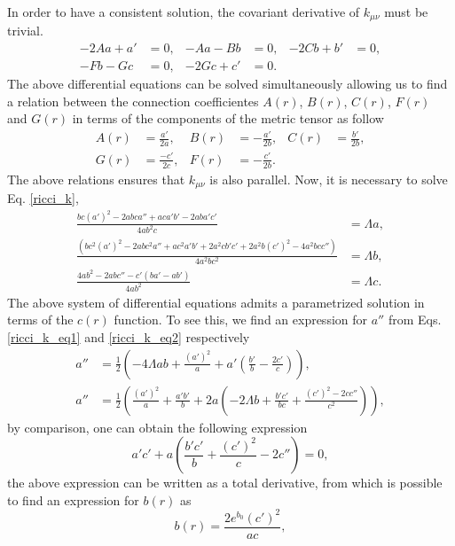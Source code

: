 \documentclass{article}
\begin{document}
In order to have a consistent solution, the covariant
derivative of $k_{\mu\nu}$ must be trivial. 
\begin{align}
    -2Aa + a' & = 0, & -Aa - Bb  & = 0, & -2Cb + b' & = 0, \\
    -Fb - Gc  & = 0, & -2Gc + c' & = 0.
\end{align}
The above differential equations can be solved simultaneously allowing us to find
a relation between the connection coefficientes $A(r)$, $B(r)$, $C(r)$, $F(r)$ and $G(r)$
in terms of the components of the metric tensor as follow
\begin{align}
    A(r) & = \frac{a'}{2a}, & B(r) & =  -\frac{a'}{2b}, & C(r) & = \frac{b'}{2b}, \\
    G(r) & = \frac{-c'}{2c}, & F(r) & = -\frac{c'}{2b}.
\end{align}
The above relations ensures that $k_{\mu\nu}$ is also parallel. Now, it is necessary
to solve Eq. \eqref{ricci_k}, 
\begin{align}
\frac{bc(a')^2 - 2abca'' + aca'b' - 2aba'c'}{4ab^2 c} & = \Lambda a, \label{ricci_k_eq1} \\
\frac{\left(bc^2(a')^2 - 2abc^2a'' + ac^2a'b' + 2a^2cb'c' + 2a^2b(c')^2 - 4a^2bcc''\right)}{4a^2bc^2} & = \Lambda b, \label{ricci_k_eq2} \\
\frac{4ab^2 - 2abc'' - c'\left(ba' - ab'\right)}{4ab^2} & = \Lambda c. \label{ricci_k_eq3}
\end{align}
The above system of differential equations admits a parametrized solution in terms
of the $c(r)$ function. To see this, we find an expression for $a''$ from Eqs. \eqref{ricci_k_eq1}
and \eqref{ricci_k_eq2} respectively
\begin{align}
    a'' & = \frac{1}{2}\left(-4\Lambda ab + \frac{(a')^2}{a} + a'\left(\frac{b'}{b} - \frac{2c'}{c}\right)\right), \\
    a'' & = \frac{1}{2}\left(\frac{(a')^2}{a} + \frac{a'b'}{b} + 2a\left(-2\Lambda b + \frac{b'c'}{bc} + \frac{(c')^2 - 2cc''}{c^2}\right)\right),
\end{align}
by comparison, one can obtain the following expression
\begin{equation}
    a'c' + a\left(\frac{b'c'}{b} + \frac{(c')^2}{c} - 2c''\right) = 0,
\end{equation}
the above expression can be written as a total derivative, from which is
possible to find an expression for $b(r)$ as
\begin{equation}
    b(r) = \frac{2e^{b_0}(c')^2}{ac},
\end{equation}
\end{document}
